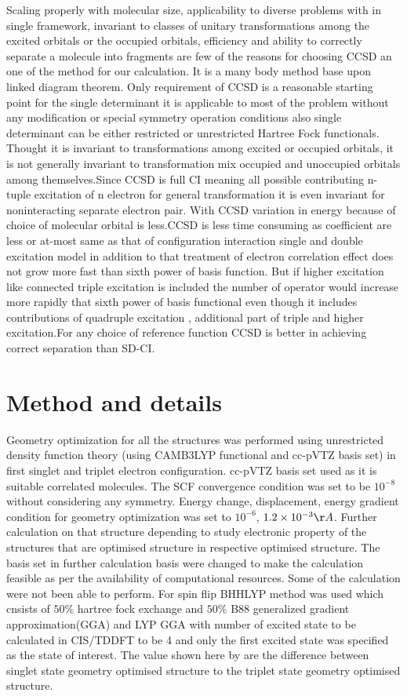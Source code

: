 \documentclass{article}
\begin{document}
Scaling properly with molecular size, applicability to diverse problems with in single framework, invariant to classes of unitary transformations among the excited orbitals or the occupied orbitals, efficiency and ability to correctly separate a molecule into fragments are few of the reasons for choosing CCSD an one of the method for our calculation. It is a many body method base upon linked diagram theorem. Only requirement of CCSD is a reasonable starting point for the single determinant it is applicable to most of the problem without any modification or special symmetry operation conditions also single determinant can be either restricted or unrestricted Hartree Fock functionals. Thought it is invariant to transformations among excited or occupied orbitals, it is not generally invariant to transformation mix occupied and unoccupied orbitals among themselves.Since CCSD is full CI meaning  all possible contributing n-tuple excitation of n electron for general transformation it is even invariant  for noninteracting separate electron pair. With CCSD variation in energy because of choice of molecular orbital is less.CCSD is less time consuming as coefficient are less or at-most same as that of configuration interaction single and double excitation model in addition to that treatment of electron correlation  effect does not grow more fast than sixth power of basis function. But if higher excitation like connected triple excitation is included the number of operator would increase more rapidly that sixth power of basis functional even though it includes contributions of quadruple excitation , additional part of triple and higher excitation.For any choice of reference function CCSD is better in achieving correct separation than SD-CI.  
\fi

\section{Method and details}

Geometry optimization for all the structures was performed using unrestricted density function theory (using CAMB3LYP functional and cc-pVTZ basis set) in first singlet and triplet electron configuration. cc-pVTZ basis set used as it is suitable correlated molecules. The SCF convergence condition was set to be \(10^{-8}\) without considering any symmetry. Energy change, displacement, energy gradient condition for geometry optimization was set to \(10^{-6}\), \(\num{1.2e-3} {\AA} \).   Further calculation on that structure depending to study electronic property of the structures that are optimised structure in respective optimised structure. The basis set in further calculation basis were changed to make the calculation feasible as per the availability of computational resources. Some of the calculation were not been able to perform. For spin flip BHHLYP method was used which cnsists of  \(50 \% \) hartree fock exchange and \(50 \% \) B88 generalized gradient approximation(GGA) and LYP GGA  \cite{Bernard_2012} with  number of excited  state to be calculated in CIS/TDDFT to be 4 and only the first excited state was specified as the state of interest. The value shown here by are the difference between singlet state geometry optimised structure to the triplet state geometry optimised structure.
\end{document}
